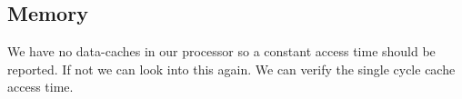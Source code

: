 \documentclass{article}
\begin{document}




\subsection{Memory}

We have no data-caches in our processor so a constant access time should be reported. If not we can look into this again. We can verify the single cycle cache access time.
    
\end{document}
